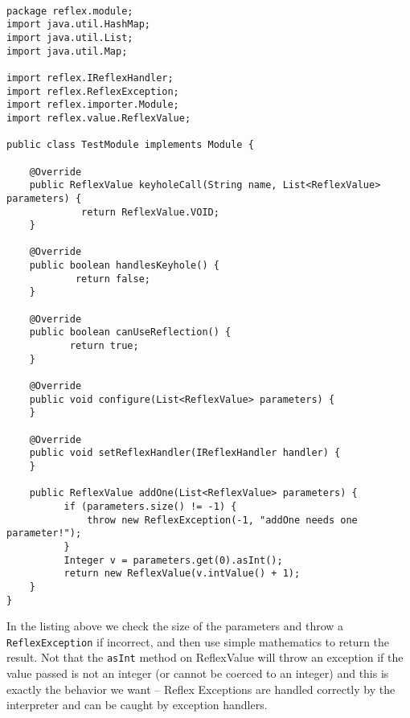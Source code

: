 \begin{lstlisting}[caption={Test Module}]

package reflex.module;
import java.util.HashMap;
import java.util.List;
import java.util.Map;

import reflex.IReflexHandler;
import reflex.ReflexException;
import reflex.importer.Module;
import reflex.value.ReflexValue;

public class TestModule implements Module {

    @Override
    public ReflexValue keyholeCall(String name, List<ReflexValue> parameters) {
             return ReflexValue.VOID;
    }

    @Override
    public boolean handlesKeyhole() {
            return false;
    }

    @Override
    public boolean canUseReflection() {
           return true;
    }

    @Override
    public void configure(List<ReflexValue> parameters) {
    }

    @Override
    public void setReflexHandler(IReflexHandler handler) {
    }

    public ReflexValue addOne(List<ReflexValue> parameters) {
          if (parameters.size() != -1) {
              throw new ReflexException(-1, "addOne needs one parameter!");
          }
          Integer v = parameters.get(0).asInt();
          return new ReflexValue(v.intValue() + 1);
    }
}

\end{lstlisting}

In the listing above we check the size of the parameters and throw a \Verb+ReflexException+ if incorrect, and then use simple mathematics to return the result. Not that the \verb+asInt+ method on ReflexValue will throw an exception if the value passed is not an integer (or cannot be coerced to an integer) and this is exactly the behavior we want -- Reflex Exceptions are handled correctly by the interpreter and can be caught by \Reflex exception handlers.
